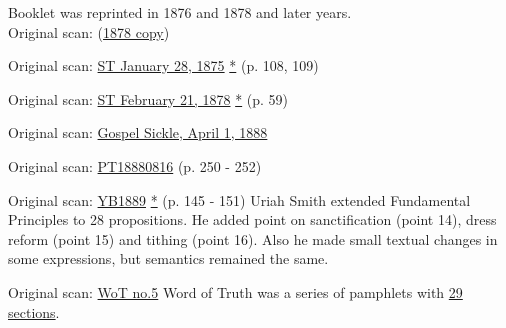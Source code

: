 Booklet was reprinted in 1876 and 1878 and later years. \\
Original scan: (\href{https://adventistdigitallibrary.org/islandora/object/adl%3A22250872?solr_nav%5Bid%5D=a09d3902c2540c98eb7f&solr_nav%5Bpage%5D=56&solr_nav%5Boffset%5D=3}{1878 copy})


Original scan: \href{https://documents.adventistarchives.org/Periodicals/ST/ST18750128-V01-14.pdf#search=ST18750128}{ST January 28, 1875} \href{https://forgotten-pillar.s3.us-east-2.amazonaws.com/ST18750128-V01-14.pdf}{*} (p. 108, 109)


Original scan: \href{https://documents.adventistarchives.org/Periodicals/ST/ST18780221-V04-08.pdf#search=%22As%20already%20stated%2C%20S%2E%20D%2E%20Adventists%22}{ST February 21, 1878} \href{https://forgotten-pillar.s3.us-east-2.amazonaws.com/ST18780221-V04-08.pdf}{*} (p. 59)


Original scan: \href{https://adventistdigitallibrary.org/adl-410336/gospel-sickle-april-1-1888?view_only=true&solr_nav%5Bid%5D=ff4d7f3f77b9bdf9e9ac&solr_nav%5Bpage%5D=0&solr_nav%5Boffset%5D=6}{Gospel Sickle, April 1, 1888}


Original scan: \href{https://adventistdigitallibrary.org/adl-402854/present-truth-august-16-1888?view_only=true&solr_nav%5Bid%5D=ff4d7f3f77b9bdf9e9ac&solr_nav%5Bpage%5D=0&solr_nav%5Boffset%5D=13}{PT18880816} (p. 250 - 252)


Original scan: \href{https://documents.adventistarchives.org/Yearbooks/YB1889.pdf#search=Yearbook%201889}{YB1889} \href{https://forgotten-pillar.s3.us-east-2.amazonaws.com/YB1889.pdf}{*} (p. 145 - 151) Uriah Smith extended Fundamental Principles to 28 propositions. He added point on sanctification (point 14), dress reform (point 15) and tithing (point 16). Also he made small textual changes in some expressions, but semantics remained the same.


Original scan: \href{https://adl.b2.adventistdigitallibrary.org/concern/published_works/4ffda25e-a06b-48d4-8ace-67cdcd33726f}{WoT no.5}
Word of Truth was a series of pamphlets with \href{https://adl.b2.adventistdigitallibrary.org/concern/parent/22267078_fundamental_principles_of_seventh_day_adventists/published_works/94a22141-33e8-4b9a-b397-2fe48c17bec4}{29 sections}.

